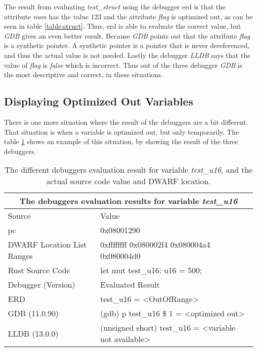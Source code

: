 The result from evaluating \emph{test\_struct} using the debugger \gls{erd} is that the attribute \emph{num} has the value $123$ and the attribute \emph{flag} is optimized out, as can be seen in table \ref{table:struct}.
Thus, \gls{erd} is able to evaluate the correct value, but \emph{GDB} gives an even better result.
Because \emph{GDB} points out that the attribute \emph{flag} is a synthetic pointer.
A synthetic pointer is a pointer that is never dereferenced, and thus the actual value is not needed. 
Lastly the debugger \emph{LLDB} says that the value of \emph{flag} is \emph{false} which is incorrect.
Thus out of the three debugger \emph{GDB} is the most descriptive and correct, in these situations.



\subsection{Displaying Optimized Out Variables}
There is one more situation where the result of the debuggers are a bit different.
That situation is when a variable is optimized out, but only temporarily.
The table \ref{table:u16} shows an example of this situation, by showing the result of the three debuggers.


\begin{table}[h]
	\centering
	\small
	\begin{tabular}{ |p{2cm}|p{8cm}|  }
		\hline
		\multicolumn{2}{|c|}{\textbf{The debuggers evaluation results for variable \emph{test\_u16}}} \\ 
		\hline
		\hline
		Source & Value \\
		\hline
		\acrfull{pc} & 0x08001290 \\

		DWARF Location List Ranges & 0xffffffff 	0x080002f4\newline
    					     0x080004a4 	0x080004d0\\

		Rust Source Code & let mut test\_u16: u16 = 500; \\
		\hline
		\hline
		Debugger (Version) & Evaluated Result \\
		\hline
		ERD & test\_u16 = \textless OutOfRange\textgreater \\

		GDB (11.0.90)  & (gdb) p test\_u16\newline
		\$ 1 = \textless optimized out\textgreater \\

		LLDB (13.0.0) & (unsigned short) test\_u16 = \textless variable not available\textgreater \\
		\hline
	\end{tabular}
	\caption{The different debuggers evaluation result for variable \emph{test\_u16}, and the actual source code value and DWARF location.}
	\label{table:u16}
\end{table}



